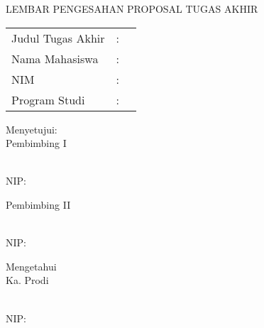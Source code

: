 \begin{titlepage}
\begin{center}
LEMBAR PENGESAHAN PROPOSAL TUGAS AKHIR

\vspace*{1cm}
\begin{tabular}{llp{10cm}}
Judul Tugas Akhir	& : & \MakeUppercase{\judulId} \\
Nama Mahasiswa 		& : & \MakeUppercase{\mahasiswa} \\
NIM 				& : & \nim \\
Program Studi 		& : & \prodi \\
\end{tabular}

\vspace*{1cm}
Menyetujui: \\
Pembimbing I

\vspace*{2cm}
\pembimbingUtama \\
NIP: \nipPembimbingUtama
	
\vspace*{1cm}
Pembimbing II

\vspace*{2cm}
\pembimbingPendamping \\
NIP: \nipPembimbingPendamping

\vfill
Mengetahui \\
Ka. Prodi \prodi

\vspace*{2cm}
\kaprodi \\
NIP: \nipKaprodi
\end{center}
\end{titlepage}